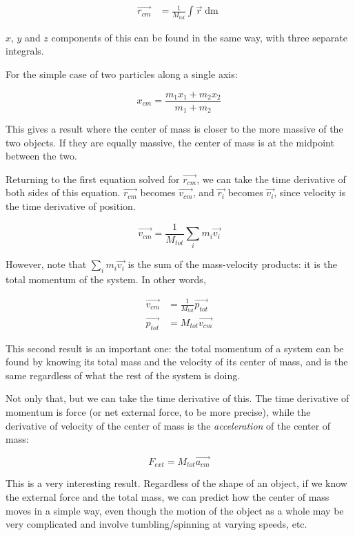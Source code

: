 \documentclass[12pt,a4paper]{report}
\begin{document}
\begin{align}
\vec{r_{cm}} &= \frac{1}{M_{tot}} \int \vec{r} \mathop{dm}
\end{align}

$x$, $y$ and $z$ components of this can be found in the same way, with three separate integrals.

For the simple case of two particles along a single axis:

\begin{equation}
x_{cm} = \frac{m_1 x_1 + m_2 x_2}{m_1 + m_2}
\end{equation}

This gives a result where the center of mass is closer to the more massive of the two objects. If they are equally massive, the center of mass is at the midpoint between the two.

Returning to the first equation solved for $\vec{r_{cm}}$, we can take the time derivative of both sides of this equation. $\vec{r_{cm}}$ becomes $\vec{v_{cm}}$, and $\vec{r_i}$ becomes $\vec{v_i}$, since velocity is the time derivative of position.

\begin{equation}
\vec{v_{cm}} = \frac{1}{M_{tot}} \sum_i m_i \vec{v_i}
\end{equation}

However, note that $\sum_i m_i \vec{v_i}$ is the sum of the mass-velocity products: it is the total momentum of the system. In other words,

\begin{align}
\vec{v_{cm}} &= \frac{1}{M_{tot}} \vec{p_{tot}}\\
\vec{p_{tot}} &= M_{tot} \vec{v_{cm}}
\end{align}

This second result is an important one: the total momentum of a system can be found by knowing its total mass and the velocity of its center of mass, and is the same regardless of what the rest of the system is doing.

Not only that, but we can take the time derivative of this. The time derivative of momentum is force (or net external force, to be more precise), while the derivative of velocity of the center of mass is the \emph{acceleration} of the center of mass:

\begin{equation}
F_{ext} = M_{tot} \vec{a_{cm}}
\end{equation}

This is a very interesting result. Regardless of the shape of an object, if we know the external force and the total mass, we can predict how the center of mass moves in a simple way, even though the motion of the object as a whole may be very complicated and involve tumbling/spinning at varying speeds, etc.
\end{document}
